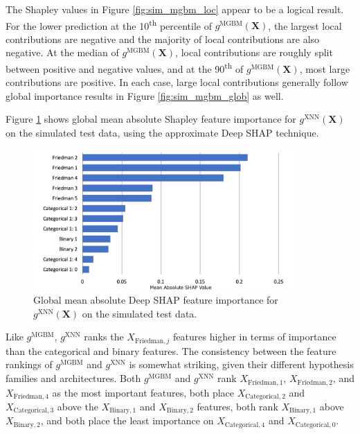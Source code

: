 \documentclass[information,article,submit,moreauthors,pdftex]{definitions/mdpi}
\begin{document}
\noindent The Shapley values in Figure \ref{fig:sim_mgbm_loc} appear to be a logical result. For the lower prediction at the 10\textsuperscript{th} percentile of $g^\text{MGBM}(\mathbf{X})$, the largest local contributions are negative and the majority of local contributions are also negative. At the median of $g^\text{MGBM}(\mathbf{X})$, local contributions are roughly split between positive and negative values, and at the 90\textsuperscript{th} of $g^\text{MGBM}(\mathbf{X})$, most large contributions are positive. In each case, large local contributions generally follow global importance results in Figure \ref{fig:sim_mgbm_glob} as well.

Figure \ref{fig:sim_xnn_glob} shows global mean absolute Shapley feature importance for $g^\text{XNN}(\mathbf{X})$ on the simulated test data, using the approximate Deep SHAP technique.  

\begin{figure}[htb]
	\captionsetup{width=16cm}
	\centering
	\includegraphics[width=10cm]{img/sim_xnn_glob.png}
	\caption{Global mean absolute Deep SHAP feature importance for $g^\text{XNN}(\mathbf{X})$ on the simulated test data.}
	\label{fig:sim_xnn_glob}
\end{figure} 

\noindent Like $g^\text{MGBM}$, $g^\text{XNN}$ ranks the $X_{\text{Friedman},j}$ features higher in terms of importance than the categorical and binary features. The consistency between the feature rankings of $g^\text{MGBM}$ and $g^\text{XNN}$ is somewhat striking, given their different hypothesis families and architectures. Both $g^\text{MGBM}$ and $g^\text{XNN}$ rank $X_{\text{Friedman},1}$, $X_{\text{Friedman},2}$, and $X_{\text{Friedman},4}$ as the most important features, both place $X_{\text{Categorical},2}$ and $X_{\text{Categorical},3}$ above the $X_{\text{Binary},1}$ and $X_{\text{Binary},2}$ features, both rank $X_{\text{Binary},1}$ above $X_{\text{Binary},2}$, and both place the least importance on $X_{\text{Categorical},4}$ and $X_{\text{Categorical},0}$. 
\end{document}
